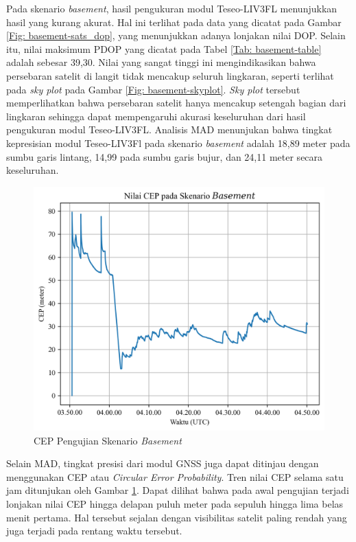 Pada skenario \textit{basement}, hasil pengukuran modul Teseo\hyp{}LIV3FL menunjukkan hasil yang kurang akurat. Hal ini terlihat pada data yang dicatat pada Gambar \ref{Fig: basement-sats_dop}, yang menunjukkan adanya lonjakan nilai DOP. Selain itu, nilai maksimum PDOP yang dicatat pada Tabel \ref{Tab: basement-table} adalah sebesar 39,30. Nilai yang sangat tinggi ini mengindikasikan bahwa persebaran satelit di langit tidak mencakup seluruh lingkaran, seperti terlihat pada \textit{sky plot} pada Gambar \ref{Fig: basement-skyplot}. \textit{Sky plot} tersebut memperlihatkan bahwa persebaran satelit hanya mencakup setengah bagian dari lingkaran sehingga dapat mempengaruhi akurasi keseluruhan dari hasil pengukuran modul Teseo\hyp{}LIV3FL. Analisis MAD menunjukan bahwa tingkat kepresisian modul Teseo-LIV3Fl pada skenario \textit{basement} adalah 18,89 meter pada sumbu garis lintang, 14,99 pada sumbu garis bujur, dan 24,11 meter secara keseluruhan.

\begin{figure}[H]
	\centering
	\includegraphics[width=13cm]{contents/chapter-4/1-skenario-basement/cep.png}
	\caption{CEP Pengujian Skenario \textit{Basement}}
	\label{Fig: basement-cep}
\end{figure}

Selain MAD, tingkat presisi dari modul GNSS juga dapat ditinjau dengan menggunakan CEP atau \textit{Circular Error Probability}. Tren nilai CEP selama satu jam ditunjukan oleh Gambar \ref{Fig: basement-cep}. Dapat dilihat bahwa pada awal pengujian terjadi lonjakan nilai CEP hingga delapan puluh meter pada sepuluh hingga lima belas menit pertama. Hal tersebut sejalan dengan visibilitas satelit paling rendah yang juga terjadi pada rentang waktu tersebut. 

